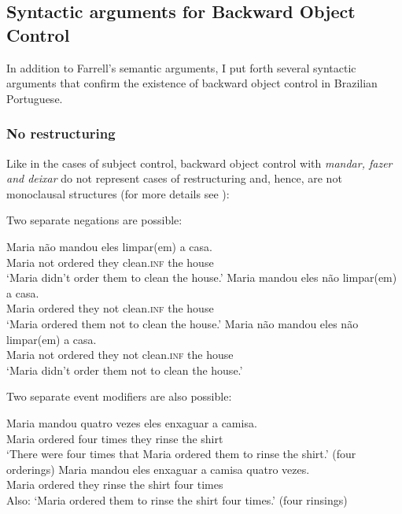 \documentclass[output=paper]{langsci/langscibook}
\begin{document}
\z

\subsection{Syntactic arguments for Backward Object Control} %

In addition to Farrell’s semantic arguments, I put forth several syntactic arguments that confirm the existence of backward object control in Brazilian Portuguese.

\subsubsection{No restructuring}%

Like in the cases of subject control, backward object control with \textit{mandar, fazer and deixar}\textbf{ }do not represent cases of restructuring and, hence, are not monoclausal structures (for more details see \citealt{Cyrino2010}):

Two separate negations are possible:

\ea%
    \label{ex:moreno:14}
    \ea
    \gll Maria não   mandou   eles limpar(em)   a casa.\\
         Maria not   ordered   they clean.\textsc{inf}   the house\\
    \glt ‘Maria didn’t order them to clean the house.’
    \ex  
    \gll Maria mandou   eles não   limpar(em)   a casa.\\
         Maria ordered   they not   clean.\textsc{inf}   the house\\
    \glt ‘Maria ordered them not  to clean  the house.’
    \ex  
    \gll Maria não   mandou   eles não limpar(em)   a casa.\\
         Maria  not   ordered   they not clean.\textsc{inf}   the house\\
    \glt ‘Maria didn’t order them not to clean the house.’
    \z
\z

Two separate event modifiers are also possible:

\ea%
    \label{ex:moreno:15}
    \ea
    \gll Maria mandou   quatro vezes  eles enxaguar   a camisa.\\
         Maria ordered    four    times  they rinse   the shirt\\
    \glt ‘There were four times that Maria ordered them to rinse the shirt.’ (four orderings)
    \ex  
    \gll Maria mandou eles   enxaguar   a camisa   quatro vezes.\\
         Maria ordered they   rinse     the shirt  four times\\
    \glt Also: ‘Maria ordered them to rinse the shirt four times.’ (four rinsings)
    \z
\z
\end{document}
